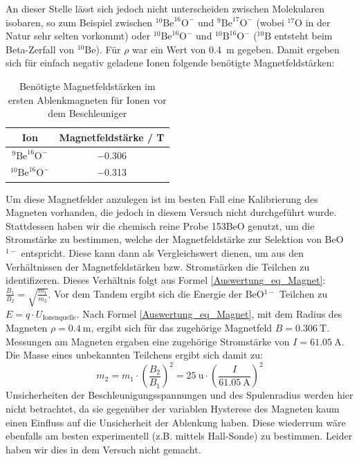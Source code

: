 An dieser Stelle lässt sich jedoch nicht unterscheiden zwischen Molekularen isobaren, so zum Beispiel zwischen $^{10}\text{Be}^{16}\text{O}^{-}$ und $^{9}\text{Be}^{17}\text{O}^{-}$ (wobei $^{17}\text{O}$ in der Natur sehr selten vorkommt) oder $^{10}\text{Be}^{16}\text{O}^{-}$ und $^{10}\text{B}^{16}\text{O}^{-}$ ($^{10}\text{B}$ entsteht beim Beta-Zerfall von $^{10}\text{Be}$).
Für $\rho$ war ein Wert von \SI{0.4}{\metre} gegeben.
Damit ergeben sich für einfach negativ geladene Ionen folgende benötigte Magnetfeldstärken:
\begin{table}[H]
  \centering
  \caption{Benötigte Magnetfeldstärken im ersten Ablenkmagneten für Ionen vor dem Beschleuniger}
  \begin{tabular}{|c|c|}
    \hline
    Ion & Magnetfeldstärke / \si{\tesla} \\
    \hline
    $^{9}\text{Be}^{16}\text{O}^{-}$ & \num{-0.306} \\
    \hline
    $^{10}\text{Be}^{16}\text{O}^{-}$ & \num{-0.313} \\
    \hline
  \end{tabular}
  \label{Auswertung_tab_Ionenenergien_vor_Besch}
\end{table}
Um diese Magnetfelder anzulegen ist im besten Fall eine Kalibrierung des Magneten vorhanden, die jedoch in diesem Versuch nicht durchgeführt wurde.
Stattdessen haben wir die chemisch reine Probe 153BeO genutzt, um die Stromstärke zu bestimmen, welche der Magnetfeldstärke zur Selektion von BeO$^{1-}$ entspricht.
Diese kann dann als Vergleichswert dienen, um aus den Verhältnissen der Magnetfeldstärken bzw. Stromstärken die Teilchen zu identifizeren.
Dieses Verhältnis folgt aus Formel \ref{Auswertung_eq_Magnet}: $\frac{B_1}{B_2} = \sqrt{\frac{m_1}{m_2}}$.
Vor dem Tandem ergibt sich die Energie der BeO$^{1-}$ Teilchen zu $E = q \cdot U_{\text{Ionenquelle}}$.
Nach Formel \ref{Auswertung_eq_Magnet}, mit dem Radius des Magneten $\rho = \SI{0.4}{\metre}$, ergibt sich für das zugehörige Magnetfeld $B = \SI{0.306}{\tesla}$.
Messungen am Magneten ergaben eine zugehörige Stromstärke von $I = \SI{61.05}{\ampere}$.
Die Masse eines unbekannten Teilchens ergibt sich damit zu:
\begin{equation}
    m_2 = m_1 \cdot \left( \frac{B_2}{B_1} \right)^{2} = \SI{25}{\atomicmassunit} \cdot \left (\frac{I}{\SI{61.05}{\ampere}}\right )^{2}
    \label{Auswertung_LE_masse}
\end{equation}
Unsicherheiten der Beschleunigungsspannungen und des Spulenradius werden hier nicht betrachtet, da sie gegenüber der variablen Hysterese des Magneten kaum einen Einfluss auf die Unsicherheit der Ablenkung haben.
Diese wiederrum wäre ebenfalls am besten experimentell (z.B. mittels Hall-Sonde) zu bestimmen.
Leider haben wir dies in dem Versuch nicht gemacht.


